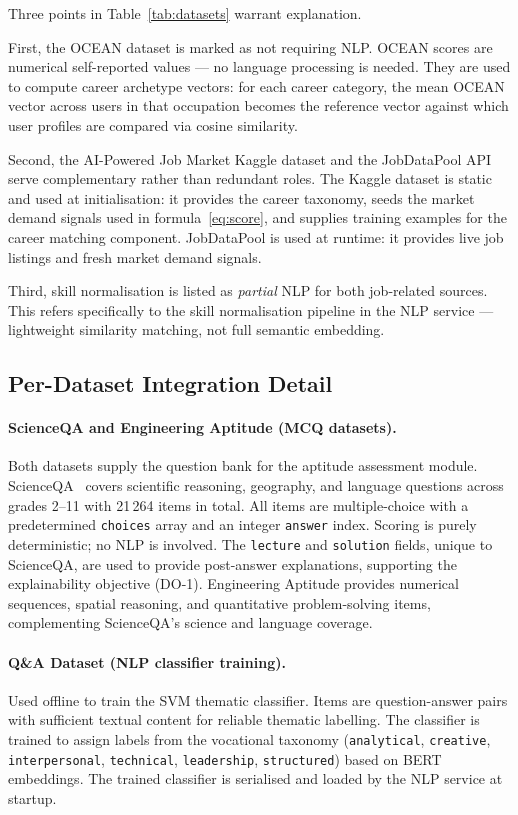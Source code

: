 Three points in Table~\ref{tab:datasets} warrant explanation.

First, the OCEAN dataset is marked as not requiring NLP. OCEAN scores are
numerical self-reported values --- no language processing is needed. They are
used to compute career archetype vectors: for each career category, the mean
OCEAN vector across users in that occupation becomes the reference vector
against which user profiles are compared via cosine similarity.

Second, the AI-Powered Job Market Kaggle dataset and the JobDataPool API serve
complementary rather than redundant roles. The Kaggle dataset is static and
used at initialisation: it provides the career taxonomy, seeds the market
demand signals used in formula~\eqref{eq:score}, and supplies training
examples for the career matching component. JobDataPool is used at runtime:
it provides live job listings and fresh market demand signals.

Third, skill normalisation is listed as \emph{partial} NLP for both
job-related sources. This refers specifically to the skill normalisation
pipeline in the NLP service --- lightweight similarity matching, not full
semantic embedding.

\subsection{Per-Dataset Integration Detail}

\paragraph{ScienceQA and Engineering Aptitude (MCQ datasets).}
Both datasets supply the question bank for the aptitude assessment module.
ScienceQA~\cite{scienceqa} covers scientific reasoning, geography, and
language questions across grades 2--11 with 21\,264 items in total. All items
are multiple-choice with a predetermined \texttt{choices} array and an integer
\texttt{answer} index. Scoring is purely deterministic; no NLP is involved.
The \texttt{lecture} and \texttt{solution} fields, unique to ScienceQA, are
used to provide post-answer explanations, supporting the explainability
objective (DO-1). Engineering Aptitude provides numerical sequences, spatial
reasoning, and quantitative problem-solving items, complementing ScienceQA's
science and language coverage.

\paragraph{Q\&A Dataset (NLP classifier training).}
Used offline to train the SVM thematic classifier. Items are question-answer
pairs with sufficient textual content for reliable thematic labelling. The
classifier is trained to assign labels from the vocational taxonomy
(\texttt{analytical}, \texttt{creative}, \texttt{interpersonal},
\texttt{technical}, \texttt{leadership}, \texttt{structured}) based on BERT
embeddings. The trained classifier is serialised and loaded by the NLP service
at startup.

